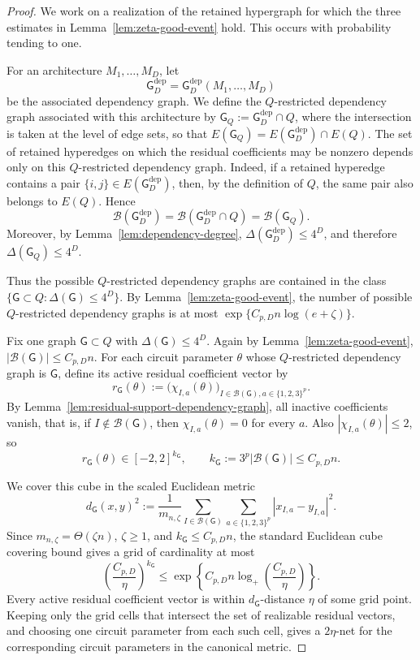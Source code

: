 \documentclass[12pt]{article}
\newcommand{\mcB}{\mathcal{B}}
\begin{document}
\begin{proof}
We work on a realization of the retained hypergraph for which the three estimates
in Lemma~\ref{lem:zeta-good-event} hold. This occurs with probability tending
to one. 

For an architecture \(M_1,\dots,M_D\), let
\[
    \mathsf G_D^{\mathrm{dep}}
    =
    \mathsf G_D^{\mathrm{dep}}(M_1,\dots,M_D)
\]
be the associated dependency graph. We define the \(Q\)-restricted dependency graph associated with this
architecture by $\mathsf G_Q
    :=
    \mathsf G_D^{\mathrm{dep}}\cap Q$, where the intersection is taken at the level of edge sets, so that $E(\mathsf G_Q)
    =
    E(\mathsf G_D^{\mathrm{dep}})\cap E(Q)$. The set of retained hyperedges on which the residual coefficients may be nonzero depends only on this \(Q\)-restricted dependency graph. Indeed, if a retained hyperedge contains a
pair \(\{i,j\}\in E(\mathsf G_D^{\mathrm{dep}})\), then, by the definition of
\(Q\), the same pair also belongs to \(E(Q)\). Hence
\[
    \mcB(\mathsf G_D^{\mathrm{dep}})
    =
    \mcB(\mathsf G_D^{\mathrm{dep}}\cap Q)
    =
    \mcB(\mathsf G_Q).
\]
Moreover, by Lemma~\ref{lem:dependency-degree},
\(\Delta(\mathsf G_D^{\mathrm{dep}})\le4^D\), and therefore $\Delta(\mathsf G_Q)\le4^D$. 

Thus the possible \(Q\)-restricted dependency graphs are contained in the
class $\{\mathsf G\subset Q:\Delta(\mathsf G)\le4^D\}$.
By Lemma~\ref{lem:zeta-good-event}, the number of possible \(Q\)-restricted dependency graphs is at most $\exp\{C_{p,D}n\log(e+\zeta)\}$.

Fix one graph \(\mathsf G\subset Q\) with \(\Delta(\mathsf G)\le4^D\). Again by Lemma~\ref{lem:zeta-good-event}, $|\mcB(\mathsf G)|\le C_{p,D}n$. For each circuit parameter \(\theta\) whose \(Q\)-restricted dependency graph is \(\mathsf G\), define its active residual coefficient vector by
\[
    r_{\mathsf G}(\theta)
    :=
    \bigl(\chi_{I,a}(\theta)\bigr)_
    {I\in\mcB(\mathsf G),a\in\{1,2,3\}^p}.
\]
By Lemma~\ref{lem:residual-support-dependency-graph}, all inactive coefficients vanish, that is, if \(I\notin\mcB(\mathsf G)\), then
\(\chi_{I,a}(\theta)=0\) for every \(a\). Also \(|\chi_{I,a}(\theta)|\le2\), so
\[
    r_{\mathsf G}(\theta)\in[-2,2]^{k_{\mathsf G}},
    \qquad
    k_{\mathsf G}:=3^p|\mcB(\mathsf G)|\le C_{p,D}n .
\]

We cover this cube in the scaled Euclidean metric
\[
    d_{\mathsf G}(x,y)^2
    :=
    \frac1{m_{n,\zeta}}
    \sum_{I\in\mcB(\mathsf G)}
    \sum_{a\in\{1,2,3\}^p}
    |x_{I,a}-y_{I,a}|^2 .
\]
Since \(m_{n,\zeta} =\Theta( \zeta n) \), \(\zeta\ge1\), and
\(k_{\mathsf G}\le C_{p,D}n\), the standard Euclidean cube covering bound gives a grid of cardinality at most
\[
    \left(\frac{C_{p,D}}{\eta}\right)^{k_{\mathsf G}}
    \le
    \exp\left\{
        C_{p,D}n
        \log_+\left(\frac{C_{p,D}}{\eta}\right)
    \right\}.
\]
Every active residual coefficient vector is within \(d_{\mathsf G}\)-distance \(\eta\) of some grid point. Keeping only the grid cells that intersect the set of realizable residual
vectors, and choosing one circuit parameter from each such cell, gives a
\(2\eta\)-net for the corresponding circuit parameters in the canonical metric.


\end{proof}
\end{document}
